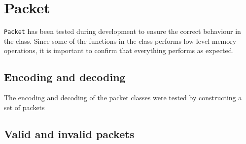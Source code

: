 \section{Packet}
\texttt{Packet} has been tested during development to ensure the correct behaviour in the class. Since some of the functions in the class performs low level memory operations, it is important to confirm that everything performs as expected.

\subsection{Encoding and decoding}
The encoding and decoding of the packet classes were tested by constructing a set of packets

\subsection{Valid and invalid packets}